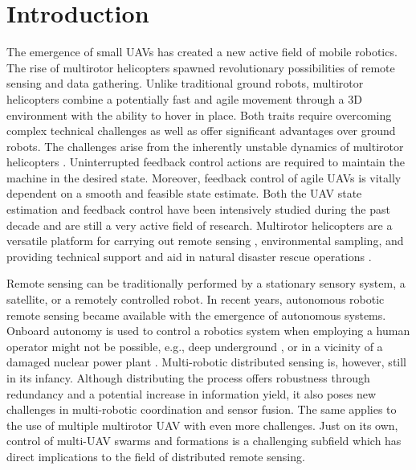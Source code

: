 \documentclass[a4paper,11pt,titlepage,twoside]{book}
\newcommand{\chapternoclear}[1]{
  \begingroup
  \let\cleardoublepage\clearpage
  \chapter{#1}
  \endgroup
}
\newcommand{\conditionalClearPage}{
  \ifdefined\printversion
  \clearemptydoublepage
  \else
  \newpage{}
  \clearpage
  \fi
}
\begin{document}


\conditionalClearPage


\conditionalClearPage


\conditionalClearPage


\pagestyle{fancy}

\conditionalClearPage
\tableofcontents



\chapternoclear{Introduction}

The emergence of small \acp{UAV} has created a new active field of mobile robotics.
The rise of multirotor helicopters spawned revolutionary possibilities of remote sensing and data gathering.
Unlike traditional ground robots, multirotor helicopters combine a potentially fast and agile movement through a 3D environment with the ability to hover in place.
Both traits require overcoming complex technical challenges as well as offer significant advantages over ground robots.
The challenges arise from the inherently unstable dynamics of multirotor helicopters \cite{kumar2012opportunities, mueller2014stability}.
Uninterrupted feedback control actions are required to maintain the machine in the desired state.
Moreover, feedback control of agile \acp{UAV} is vitally dependent on a smooth and feasible state estimate.
Both the \ac{UAV} state estimation \cite{merino2006vision, burri2015robust, grabe2015nonlinear} and feedback control \cite{lee2010geometric, goodarzi2015geometric, kamel2017robust} have been intensively studied during the past decade and are still a very active field of research.
Multirotor helicopters are a versatile platform for carrying out remote sensing \cite{colomina2014unmanned, pajares2015overview}, environmental sampling, and providing technical support and aid in natural disaster rescue operations \cite{yuan2015survey, perks2016advances}.

Remote sensing can be traditionally performed by a stationary sensory system, a satellite, or a remotely controlled robot.
In recent years, autonomous robotic remote sensing became available with the emergence of autonomous systems.
Onboard autonomy is used to control a robotics system when employing a human operator might not be possible, e.g., deep underground \cite{apachristos2019autonomous, losch2018design}, or in a vicinity of a damaged nuclear power plant \cite{sato2019radiation}.
Multi-robotic distributed sensing is, however, still in its infancy.
Although distributing the process offers robustness through redundancy and a potential increase in information yield, it also poses new challenges in multi-robotic coordination and sensor fusion.
The same applies to the use of multiple multirotor \ac{UAV} with even more challenges.
Just on its own, control of multi-\ac{UAV} swarms and formations is a challenging subfield which has direct implications to the field of distributed remote sensing.
\end{document}
